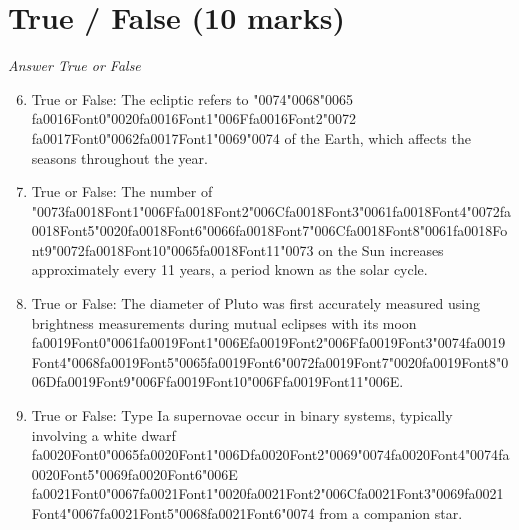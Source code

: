 \documentclass[12pt]{article}
\begin{document}
\section*{True / False (10 marks)}
\textit{Answer True or False}
\begin{enumerate}[label=\arabic*.]
\setcounter{enumi}{5}
\item True or False: The ecliptic refers to {\char"0074}{\char"0068}{\char"0065} {\csname fa0016Font0\endcsname\char"0020}{\csname fa0016Font1\endcsname\char"006F}{\csname fa0016Font2\endcsname\char"0072} {\csname fa0017Font0\endcsname\char"0062}{\csname fa0017Font1\endcsname\char"0069}{\char"0074} of the Earth, which affects the seasons throughout the year.
\item True or False: The number of {\char"0073}{\csname fa0018Font1\endcsname\char"006F}{\csname fa0018Font2\endcsname\char"006C}{\csname fa0018Font3\endcsname\char"0061}{\csname fa0018Font4\endcsname\char"0072}{\csname fa0018Font5\endcsname\char"0020}{\csname fa0018Font6\endcsname\char"0066}{\csname fa0018Font7\endcsname\char"006C}{\csname fa0018Font8\endcsname\char"0061}{\csname fa0018Font9\endcsname\char"0072}{\csname fa0018Font10\endcsname\char"0065}{\csname fa0018Font11\endcsname\char"0073} on the Sun increases approximately every 11 years, a period known as the solar cycle.
\item True or False: The diameter of Pluto was first accurately measured using brightness measurements during mutual eclipses with its moon {\csname fa0019Font0\endcsname\char"0061}{\csname fa0019Font1\endcsname\char"006E}{\csname fa0019Font2\endcsname\char"006F}{\csname fa0019Font3\endcsname\char"0074}{\csname fa0019Font4\endcsname\char"0068}{\csname fa0019Font5\endcsname\char"0065}{\csname fa0019Font6\endcsname\char"0072}{\csname fa0019Font7\endcsname\char"0020}{\csname fa0019Font8\endcsname\char"006D}{\csname fa0019Font9\endcsname\char"006F}{\csname fa0019Font10\endcsname\char"006F}{\csname fa0019Font11\endcsname\char"006E}.
\item True or False: Type Ia supernovae occur in binary systems, typically involving a white dwarf {\csname fa0020Font0\endcsname\char"0065}{\csname fa0020Font1\endcsname\char"006D}{\csname fa0020Font2\endcsname\char"0069}{\char"0074}{\csname fa0020Font4\endcsname\char"0074}{\csname fa0020Font5\endcsname\char"0069}{\csname fa0020Font6\endcsname\char"006E} {\csname fa0021Font0\endcsname\char"0067}{\csname fa0021Font1\endcsname\char"0020}{\csname fa0021Font2\endcsname\char"006C}{\csname fa0021Font3\endcsname\char"0069}{\csname fa0021Font4\endcsname\char"0067}{\csname fa0021Font5\endcsname\char"0068}{\csname fa0021Font6\endcsname\char"0074} from a companion star.

\end{enumerate}
\end{document}
